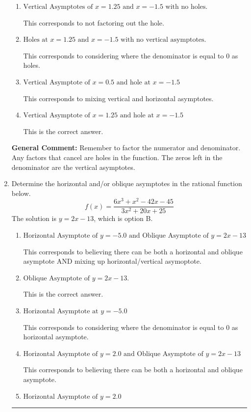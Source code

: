 \documentclass{extbook}[14pt]
\newcommand{\litem}[1]{\item #1

\rule{\textwidth}{0.4pt}}
\begin{document}
\begin{enumerate}
{\begin{enumerate}[label=\Alph*.]
This corresponds to setting the numerator equal to 0.
\item \( \text{Vertical Asymptotes of } x = 1.25 \text{ and } x = -1.5 \text{ with no holes.} \)

This corresponds to not factoring out the hole.
\item \( \text{Holes at } x = 1.25 \text{ and } x = -1.5 \text{ with no vertical asymptotes.} \)

This corresponds to considering where the denominator is equal to 0 as holes.
\item \( \text{Vertical Asymptote of } x = 0.5 \text{ and hole at } x = -1.5 \)

This corresponds to mixing vertical and horizontal asymptotes.
\item \( \text{Vertical Asymptote of } x = 1.25 \text{ and hole at } x = -1.5 \)

This is the correct answer.
\end{enumerate}

\textbf{General Comment:} Remember to factor the numerator and denominator. Any factors that cancel are holes in the function. The zeros left in the denominator are the vertical asymptotes.
}
\litem{
Determine the horizontal and/or oblique asymptotes in the rational function below.
\[ f(x) = \frac{6x^{3} + x^{2} -42 x -45}{3x^{2} +20 x + 25} \]The solution is \( y = 2x -13 \), which is option B.\begin{enumerate}[label=\Alph*.]
\item \( \text{Horizontal Asymptote of } y = -5.0 \text{ and Oblique Asymptote of } y = 2x -13 \)

This corresponds to believing there can be both a horizontal and oblique asymptote AND mixing up horizontal/vertical asymoptote.
\item \( \text{Oblique Asymptote of } y = 2x -13. \)

This is the correct answer.
\item \( \text{Horizontal Asymptote at } y = -5.0 \)

This corresponds to considering where the denominator is equal to 0 as horizontal asymptote.
\item \( \text{Horizontal Asymptote of } y = 2.0 \text{ and Oblique Asymptote of } y = 2x -13 \)

This corresponds to believing there can be both a horizontal and oblique asymptote.
\item \( \text{Horizontal Asymptote of } y = 2.0  \)


\end{enumerate}}
\end{enumerate}
\end{document}
